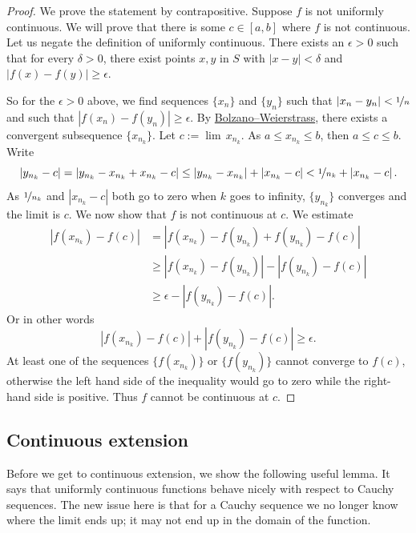 \documentclass[12pt]{book}
\newcommand{\abs}[1]{\left\lvert {#1} \right\rvert}
\theoremstyle{plain}
\theoremstyle{remark}
\theoremstyle{definition}
\theoremstyle{exercise}
\theoremstyle{example}
\begin{document}
\begin{proof}
We prove the statement by contrapositive.
Suppose $f$ is not uniformly continuous.  We will prove
that there is some
$c \in [a,b]$ where $f$ is not continuous.  Let us negate
the definition of uniformly continuous.
There exists an $\epsilon > 0$
such that for every $\delta > 0$, there exist points $x, y$ in $S$ with
$\abs{x-y} < \delta$ and $\abs{f(x)-f(y)} \geq \epsilon$.

So for the $\epsilon > 0$ above,
we find sequences $\{ x_n \}$ and $\{ y_n \}$ such that
$\abs{x_n-y_n} < \nicefrac{1}{n}$ and such that $\abs{f(x_n)-f(y_n)} \geq
\epsilon$.  By
\hyperref[thm:bwseq]{Bolzano--Weierstrass},
there exists a convergent subsequence
$\{ x_{n_k} \}$.  Let $c := \lim\, x_{n_k}$.
As $a \leq x_{n_k} \leq b$, then $a \leq c \leq b$.  Write
\begin{equation*}
\abs{y_{n_k} - c} =
\abs{y_{n_k} - x_{n_k} + x_{n_k} - c} \leq
\abs{y_{n_k} - x_{n_k}}
+
\abs{x_{n_k}-c}
<
\nicefrac{1}{n_k} 
+
\abs{x_{n_k}-c} .
\end{equation*}
As $\nicefrac{1}{n_k}$ and $\abs{x_{n_k}-c}$ both go to zero when
$k$ goes to infinity, $\{ y_{n_k} \}$ converges and the limit
is $c$.  We now show that $f$ is not continuous at $c$.  We
estimate
\begin{equation*}
\begin{split}
\abs{f(x_{n_k}) - f(c)} & =
\abs{f(x_{n_k}) - f(y_{n_k}) + f(y_{n_k}) - f(c)} \\
& \geq
\abs{f(x_{n_k}) - f(y_{n_k})} - \abs{f(y_{n_k}) - f(c)} \\
& \geq
\epsilon - \abs{f(y_{n_k})-f(c)} .
\end{split}
\end{equation*}
Or in other words
\begin{equation*}
\abs{f(x_{n_k})-f(c)} 
+
\abs{f(y_{n_k})-f(c)}  \geq
\epsilon .
\end{equation*}
At least one of the sequences $\{ f(x_{n_k}) \}$  or
$\{ f(y_{n_k}) \}$ cannot converge to $f(c)$, otherwise the left
hand side of the inequality would go to zero while the right-hand side is positive.
Thus $f$ cannot be continuous at $c$.
\end{proof}

\subsection{Continuous extension}

Before we get to continuous extension, we show the following useful lemma.
It says that uniformly continuous functions behave nicely with respect
to Cauchy sequences.  The new issue here is that for a Cauchy sequence
we no longer know where the limit ends up; it may not end up in the domain
of the function.
\end{document}
